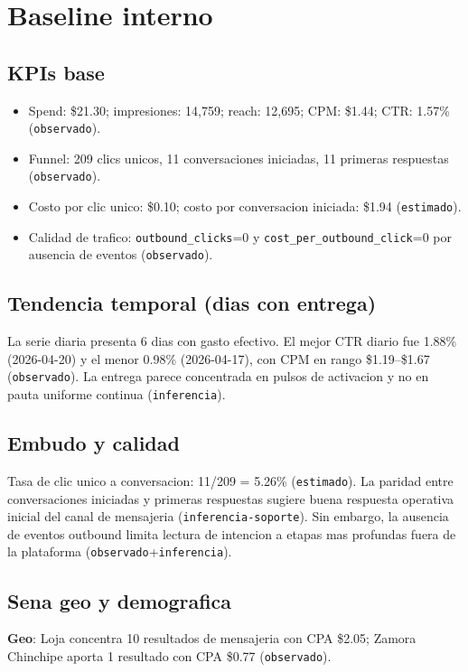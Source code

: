 \documentclass[9pt,a4paper,twocolumn,twoside]{tau-class/tau}
\begin{document}
\section{Baseline interno}
\subsection{KPIs base}
\begin{itemize}
  \item Spend: \$21.30; impresiones: 14,759; reach: 12,695; CPM: \$1.44; CTR: 1.57\% (\texttt{observado}).
  \item Funnel: 209 clics unicos, 11 conversaciones iniciadas, 11 primeras respuestas (\texttt{observado}).
  \item Costo por clic unico: \$0.10; costo por conversacion iniciada: \$1.94 (\texttt{estimado}).
  \item Calidad de trafico: \texttt{outbound\_clicks}=0 y \texttt{cost\_per\_outbound\_click}=0 por ausencia de eventos (\texttt{observado}).
\end{itemize}

\subsection{Tendencia temporal (dias con entrega)}
La serie diaria presenta 6 dias con gasto efectivo. El mejor CTR diario fue 1.88\% (2026-04-20) y el menor 0.98\% (2026-04-17), con CPM en rango \$1.19--\$1.67 (\texttt{observado}). La entrega parece concentrada en pulsos de activacion y no en pauta uniforme continua (\texttt{inferencia}).

\subsection{Embudo y calidad}
Tasa de clic unico a conversacion: 11/209 = 5.26\% (\texttt{estimado}). La paridad entre conversaciones iniciadas y primeras respuestas sugiere buena respuesta operativa inicial del canal de mensajeria (\texttt{inferencia-soporte}). Sin embargo, la ausencia de eventos outbound limita lectura de intencion a etapas mas profundas fuera de la plataforma (\texttt{observado}+\texttt{inferencia}).

\subsection{Sena geo y demografica}
\textbf{Geo}: Loja concentra 10 resultados de mensajeria con CPA \$2.05; Zamora Chinchipe aporta 1 resultado con CPA \$0.77 (\texttt{observado}).
\end{document}
